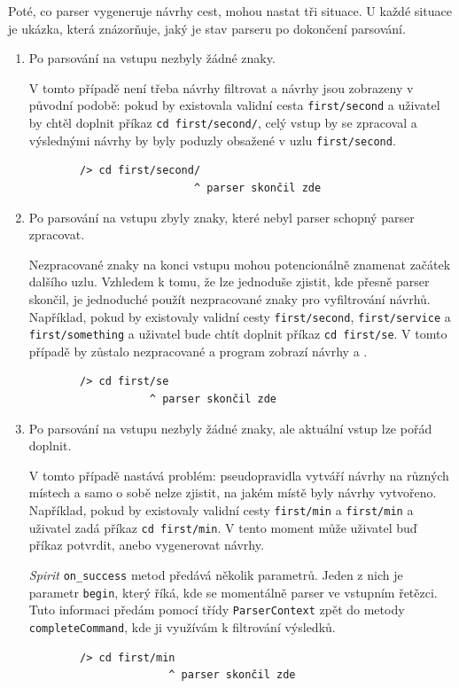 \documentclass[thesis=B,czech,hidelinks]{FITthesis}[2019/03/06]
\begin{document}
Poté, co parser vygeneruje návrhy cest, mohou nastat tři situace. U každé situace je ukázka, která znázorňuje, jaký je stav parseru po dokončení parsování.
\begin{enumerate}
    \item Po parsování na vstupu nezbyly žádné znaky.

        V tomto případě není třeba návrhy filtrovat a návrhy jsou zobrazeny v původní podobě: pokud by existovala validní cesta \texttt{first/second} a uživatel by chtěl doplnit příkaz \texttt{cd first/second/}, celý vstup by se zpracoval a výslednými návrhy by byly poduzly obsažené v uzlu \texttt{first/second}.
        \begin{verbatim}
        /> cd first/second/
                          ^ parser skončil zde
        \end{verbatim}
    \item Po parsování na vstupu zbyly znaky, které nebyl parser schopný parser zpracovat.

        Nezpracované znaky na konci vstupu mohou potencionálně znamenat začátek dalšího uzlu. Vzhledem k tomu, že lze jednoduše zjistit, kde přesně parser skončil, je jednoduché použít nezpracované znaky pro vyfiltrování návrhů. Například, pokud by existovaly validní cesty \texttt{first/second}, \texttt{first/service} a \texttt{first/something} a uživatel bude chtít doplnit příkaz \texttt{cd first/se}. V tomto případě by  zůstalo nezpracované a program zobrazí návrhy  a .
        \begin{verbatim}
        /> cd first/se
                   ^ parser skončil zde
        \end{verbatim}
    \item Po parsování na vstupu nezbyly žádné znaky, ale aktuální vstup lze pořád doplnit.

        V tomto případě nastává problém: pseudopravidla vytváří návrhy na různých místech a samo o sobě nelze zjistit, na jakém místě byly návrhy vytvořeno. Například, pokud by existovaly validní cesty \texttt{first/min} a \texttt{first/min} a uživatel zadá příkaz \texttt{cd first/min}. V tento moment může uživatel buď příkaz potvrdit, anebo vygenerovat návrhy.

        \textit{Spirit} \texttt{on\_success} metod předává několik parametrů. Jeden z nich je parametr \texttt{begin}, který říká, kde se momentálně parser ve vstupním řetězci. Tuto informaci předám pomocí třídy \texttt{ParserContext} zpět do metody \texttt{completeCommand}, kde ji využívám k filtrování výsledků.
        \begin{verbatim}
        /> cd first/min
                      ^ parser skončil zde
        \end{verbatim}
\end{enumerate}
\end{document}
